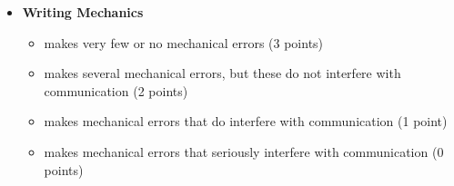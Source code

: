 \documentclass[11pt,letterpaper]{article}
\begin{document}
\begin{itemize}
\item \textbf{Writing Mechanics}
\begin{itemize}
\item[\underline{\hspace{.2in}}]  makes very few or no mechanical errors (3 points)
\item[\underline{\hspace{.2in}}] makes several mechanical errors, but these do not interfere with communication (2 points)
\item[\underline{\hspace{.2in}}] makes mechanical errors that do interfere with communication (1 point)
\item[\underline{\hspace{.2in}}] makes mechanical errors that seriously interfere with communication (0 points)
\end{itemize}
\end{itemize}
\end{document}
